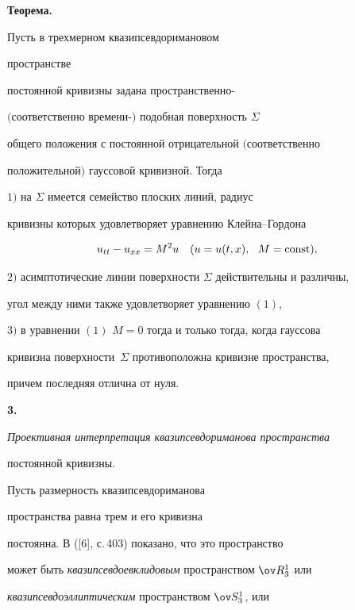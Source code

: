 {\bf Теорема.} {\it 


Пусть в трехмерном квазипсевдоримановом 


пространстве


постоянной кривизны  задана пространственно-


$($соответственно времени-$)$ подобная поверхность $\Sigma$ 


общего положения с постоянной отрицательной $($соответственно


по\-ло\-жи\-тель\-ной$)$ гауссовой кривизной. Тогда





$1)$ на $\Sigma$ имеется семейство плоских линий, радиус


кривизны которых удовлетворяет уравнению Клейна--Гордона


\begin{equation}


u_{tt}-u_{xx}=M^2u\quad (u=u(t,x),\ \ M=\const),


\end{equation}





$2)$ асимптотические линии поверхности $\Sigma$ действительны и различны,


угол между ними также удовлетворяет уравнению $(1)$,





$3)$ в уравнении $(1)$ $M=0$ тогда и только тогда, когда гауссова


кривизна поверхности~$\Sigma$ противоположна кривизне пространства,


причем последняя отлична от нуля.


}


\medskip





{\bf 3.} {\it Проективная интерпретация квазипсевдориманова пространства


постоянной кривизны.} Пусть размерность квазипсевдориманова


пространства равна трем и его кривизна


постоянна. В ([6], с.\,403) показано, что это пространство


может быть {\it квазипсевдоевклидовым} пространством $\ov R^1_3$ или


{\it квазипсевдоэллиптическим} пространством $\ov S^1_3$, или


